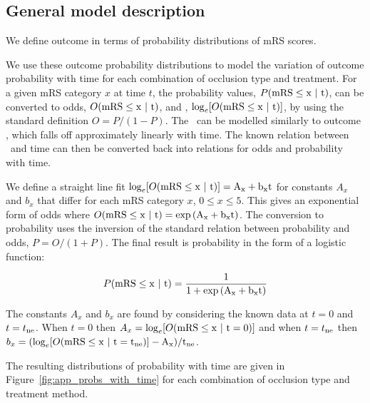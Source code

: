 \subsection{General model description}


We define outcome in terms of probability distributions of mRS scores. 


We use these outcome probability distributions to model the variation of outcome probability with time for each combination of occlusion type and treatment.
% 
For a given mRS category $x$ at time $t$, the probability values, $P(\mRS\leq x\ |\ t)$, can be converted to odds, $O(\rm{mRS}\leq x\ |\ t)$, and \logodds, $\log_e[O(\rm{mRS}\leq x\ |\ t)]$, by using the standard definition $O=P/(1-P)$.
The \logodds\ can be modelled similarly to outcome \logoddsratio, which falls off approximately linearly with time\cite{emberson_effect_2014, fransen_time_2016}. 
% 
The known relation between \logodds\ and time can then be converted back into relations for odds and probability with time.

We define a straight line fit $\log_e[O(\rm{mRS}\leq x\ |\ t)] = A_x + b_x t$
for constants $A_x$ and $b_x$ that differ for each mRS category $x$, $0\leq x \leq5$.
This gives an exponential form of odds where $O(\rm{mRS}\leq x\ |\ t) = \exp{(A_x + b_x t)}$.
The conversion to probability uses the inversion of the standard relation between probability and odds,  $P=O/(1+P)$. 
The final result is probability in the form of a logistic function:

\begin{equation}
P(\rm{mRS}\leq x\ |\ t) = \frac{1}{1+\exp{(A_x + b_x t)}}
\end{equation}


The constants $A_x$ and $b_x$ are found by considering the known data at $t=0$ and $t=t_\mathrm{ne}$. 
When $t=0$ then $A_x = \log_e[O(\mRS\leq x\ |\ t=0)]$ and when $t=t_\mathrm{ne}$ then $b_x = (\log_e[O(\rm{mRS}\leq x\ |\ t=t_\mathrm{ne})] - A_x) / t_\mathrm{ne}$. 

The resulting distributions of probability with time are given in Figure~\ref{fig:app_probs_with_time} for each combination of occlusion type and treatment method.


